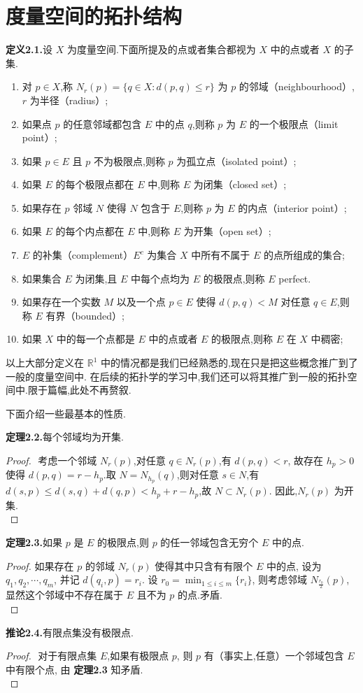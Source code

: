 \documentclass[12pt]{article}
\begin{document}
\section{度量空间的拓扑结构}
\textbf{定义2.1.}设 $X$ 为度量空间.下面所提及的点或者集合都视为 $X$ 中的点或者 $X$ 的子集.
\begin{enumerate}[label={\textbullet}]
    \item 对 $p\in X$,称 $N_r(p) = \{q\in X: d(p,q)\leq r\}$ 为 $p$ 的邻域（neighbourhood）,$r$ 为半径（radius）;
    \item 如果点 $p$ 的任意邻域都包含 $E$ 中的点 $q$,则称 $p$ 为 $E$ 的一个极限点（limit point）;
    \item 如果 $p\in E$ 且 $p$ 不为极限点,则称 $p$ 为孤立点（isolated point）;
    \item 如果 $E$ 的每个极限点都在 $E$ 中,则称 $E$ 为闭集（closed set）;
    \item 如果存在 $p$ 邻域 $N$ 使得 $N$ 包含于 $E$,则称 $p$ 为 $E$ 的内点（interior point）;
    \item 如果 $E$ 的每个内点都在 $E$ 中,则称 $E$ 为开集（open set）;
    \item $E$ 的补集（complement）$E^c$ 为集合 $X$ 中所有不属于 $E$ 的点所组成的集合;
    \item 如果集合 $E$ 为闭集,且 $E$ 中每个点均为 $E$ 的极限点,则称 $E$ perfect.
    \item 如果存在一个实数 $M$ 以及一个点 $p\in E$ 使得 $d(p,q)<M$ 对任意 $q\in E$,则称 $E$ 有界（bounded）;
    \item 如果 $X$ 中的每一个点都是 $E$ 中的点或者 $E$ 的极限点,则称 $E$ 在 $X$ 中稠密;
\end{enumerate}

以上大部分定义在 $\mathbb{R}^1$ 中的情况都是我们已经熟悉的,现在只是把这些概念推广到了一般的度量空间中.
在后续的拓扑学的学习中,我们还可以将其推广到一般的拓扑空间中.限于篇幅,此处不再赘叙.

下面介绍一些最基本的性质.

\textbf{定理2.2.}每个邻域均为开集.
\begin{proof}
    $ $
    考虑一个邻域 $N_r(p)$,对任意 $q\in N_r(p)$,有 $d(p,q)<r$,
    故存在 $h_p>0$ 使得 $d(p,q) = r-h_p$.取 $N = N_{h_p}(q)$,则对任意 $s\in N$,有
    $d(s,p)\leq d(s,q)+d(q,p) < h_p+ r-h_p$,故 $N\subset N_r(p)$.
    因此,$N_r(p)$ 为开集.\\
\end{proof}
\textbf{定理2.3.}如果 $p$ 是 $E$ 的极限点,则 $p$ 的任一邻域包含无穷个 $E$ 中的点.
\begin{proof}
    如果存在 $p$ 的邻域 $N_r(p)$ 使得其中只含有有限个 $E$ 中的点,
    设为 $q_1,q_2,\cdots,q_m$,
    并记 $d(q_i,p) = r_i$.
    设 $r_0 = \min_{1\leq i\leq m}\{r_i\}$,
    则考虑邻域 $N_{\frac{r_0}{2}}(p)$,
    显然这个邻域中不存在属于 $E$ 且不为 $p$ 的点.矛盾.\\
\end{proof}
\textbf{推论2.4.}有限点集没有极限点.
\begin{proof}
    $ $
    对于有限点集 $E$,如果有极限点 $p$,
    则 $p$ 有（事实上,任意）一个邻域包含 $E$ 中有限个点,
    由 \textbf{定理2.3} 知矛盾.\\
\end{proof}
\end{document}
